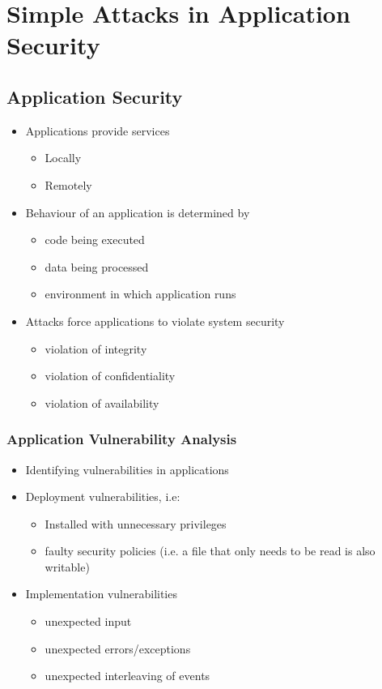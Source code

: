 \documentclass{article}
\begin{document}
\section{Simple Attacks in Application Security}
\subsection{Application Security}
\begin{itemize}
    \item Applications provide services 
    \begin{itemize}
        \item Locally
        \item Remotely
    \end{itemize}
    \item Behaviour of an application is determined by
    \begin{itemize}
        \item code being executed
        \item data being processed
        \item environment in which application runs
    \end{itemize}
    \item Attacks force applications to violate system security
    \begin{itemize}
        \item violation of integrity
        \item violation of confidentiality
        \item violation of availability
    \end{itemize}
\end{itemize}
\subsubsection{Application Vulnerability Analysis}
\begin{itemize}
    \item Identifying vulnerabilities in applications
    \item Deployment vulnerabilities, i.e:
    \begin{itemize}
        \item Installed with unnecessary privileges
        \item faulty security policies (i.e. a file that only needs to be read is also writable)
    \end{itemize}
    \item Implementation vulnerabilities
    \begin{itemize}
        \item unexpected input
        \item unexpected errors/exceptions
        \item unexpected interleaving of events
    \end{itemize}
\end{itemize}
\end{document}
